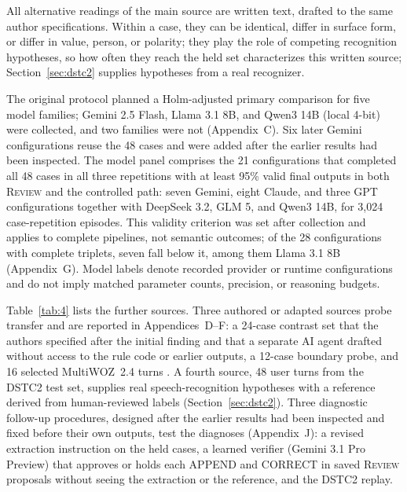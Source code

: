 \documentclass[acmsmall,review,anonymous]{acmart}
\newcommand{\review}{\textsc{Review}}
\begin{document}
All alternative readings of the main source are written text, drafted to the same author specifications. Within a case, they can be identical, differ in surface form, or differ in value, person, or polarity; they play the role of competing recognition hypotheses, so how often they reach the held set characterizes this written source; Section~\ref{sec:dstc2} supplies hypotheses from a real recognizer.

The original protocol planned a Holm-adjusted primary comparison for five model families; Gemini 2.5 Flash, Llama 3.1 8B, and Qwen3 14B (local 4-bit) were collected, and two families were not (Appendix~C). Six later Gemini configurations reuse the 48 cases and were added after the earlier results had been inspected. The model panel comprises the 21 configurations that completed all 48 cases in all three repetitions with at least 95\% valid final outputs in both \review{} and the controlled path: seven Gemini, eight Claude, and three GPT configurations together with DeepSeek 3.2, GLM 5, and Qwen3 14B, for 3,024 case-repetition episodes. This validity criterion was set after collection and applies to complete pipelines, not semantic outcomes; of the 28 configurations with complete triplets, seven fall below it, among them Llama 3.1 8B (Appendix~G). Model labels denote recorded provider or runtime configurations and do not imply matched parameter counts, precision, or reasoning budgets.

Table~\ref{tab:4} lists the further sources. Three authored or adapted sources probe transfer and are reported in Appendices~D--F: a 24-case contrast set that the authors specified after the initial finding and that a separate AI agent drafted without access to the rule code or earlier outputs, a 12-case boundary probe, and 16 selected MultiWOZ~2.4 turns \cite{cite42}. A fourth source, 48 user turns from the DSTC2 test set, supplies real speech-recognition hypotheses with a reference derived from human-reviewed labels (Section~\ref{sec:dstc2}). Three diagnostic follow-up procedures, designed after the earlier results had been inspected and fixed before their own outputs, test the diagnoses (Appendix~J): a revised extraction instruction on the held cases, a learned verifier (Gemini 3.1 Pro Preview) that approves or holds each APPEND and CORRECT in saved \review{} proposals without seeing the extraction or the reference, and the DSTC2 replay.
\end{document}
